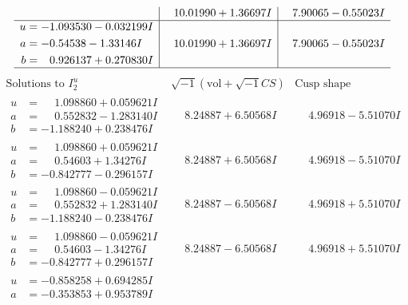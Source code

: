 \documentclass[1p]{elsarticle_modified}
\theoremstyle{definition}
\newcommand{\I}{\sqrt{-1}}
\begin{document}
$$\begin{array}{c|c|c}
 & \phantom{-}10.01990 + 1.36697 I & \phantom{-}7.90065 - 0.55023 I \\ \hline\begin{aligned}
u &= -1.093530 - 0.032199 I \\
a &= -0.54538 - 1.33146 I \\
b &= \phantom{-}0.926137 + 0.270830 I\end{aligned}
 & \phantom{-}10.01990 + 1.36697 I & \phantom{-}7.90065 - 0.55023 I\\
 \hline 
 \end{array}$$\newpage$$\begin{array}{c|c|c}  
\text{Solutions to }I^u_{2}& \I (\text{vol} + \sqrt{-1}CS) & \text{Cusp shape}\\
 \hline 
\begin{aligned}
u &= \phantom{-}1.098860 + 0.059621 I \\
a &= \phantom{-}0.552832 - 1.283140 I \\
b &= -1.188240 + 0.238476 I\end{aligned}
 & \phantom{-}8.24887 + 6.50568 I & \phantom{-}4.96918 - 5.51070 I \\ \hline\begin{aligned}
u &= \phantom{-}1.098860 + 0.059621 I \\
a &= \phantom{-}0.54603 + 1.34276 I \\
b &= -0.842777 - 0.296157 I\end{aligned}
 & \phantom{-}8.24887 + 6.50568 I & \phantom{-}4.96918 - 5.51070 I \\ \hline\begin{aligned}
u &= \phantom{-}1.098860 - 0.059621 I \\
a &= \phantom{-}0.552832 + 1.283140 I \\
b &= -1.188240 - 0.238476 I\end{aligned}
 & \phantom{-}8.24887 - 6.50568 I & \phantom{-}4.96918 + 5.51070 I \\ \hline\begin{aligned}
u &= \phantom{-}1.098860 - 0.059621 I \\
a &= \phantom{-}0.54603 - 1.34276 I \\
b &= -0.842777 + 0.296157 I\end{aligned}
 & \phantom{-}8.24887 - 6.50568 I & \phantom{-}4.96918 + 5.51070 I \\ \hline\begin{aligned}
u &= -0.858258 + 0.694285 I \\
a &= -0.353853 + 0.953789 I \\

\end{aligned}
\end{array}$$
\end{document}
